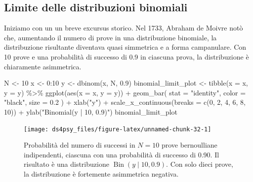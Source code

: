 \documentclass[
  11pt,
]{krantz}
\makeatletter
\newenvironment{Shaded}{\begin{snugshade}}{\end{snugshade}}
\newcommand{\AttributeTok}[1]{\textcolor[rgb]{0.61,0.61,0.61}{#1}}
\newcommand{\DecValTok}[1]{\textcolor[rgb]{0.06,0.06,0.06}{#1}}
\newcommand{\FloatTok}[1]{\textcolor[rgb]{0.06,0.06,0.06}{#1}}
\newcommand{\FunctionTok}[1]{\textcolor[rgb]{0,0,0}{#1}}
\newcommand{\NormalTok}[1]{#1}
\newcommand{\OtherTok}[1]{\textcolor[rgb]{0.37,0.37,0.37}{#1}}
\newcommand{\SpecialCharTok}[1]{\textcolor[rgb]{0,0,0}{#1}}
\newcommand{\StringTok}[1]{\textcolor[rgb]{0.5,0.5,0.5}{#1}}
\newenvironment{kframe}{%
\medskip{}
\setlength{\fboxsep}{.8em}
 \def\at@end@of@kframe{}%
 \ifinner\ifhmode%
  \def\at@end@of@kframe{\end{minipage}}%
  \begin{minipage}{\columnwidth}%
 \fi\fi%
 \def\FrameCommand##1{\hskip\@totalleftmargin \hskip-\fboxsep
 \colorbox{shadecolor}{##1}\hskip-\fboxsep
     \hskip-\linewidth \hskip-\@totalleftmargin \hskip\columnwidth}%
 \MakeFramed {\advance\hsize-\width
   \@totalleftmargin\z@ \linewidth\hsize
   \@setminipage}}%
 {\par\unskip\endMakeFramed%
 \at@end@of@kframe}
\renewenvironment{Shaded}{\begin{kframe}}{\end{kframe}}
\DeclareMathOperator{\Bin}{Bin} %
\theoremstyle{definition}
\theoremstyle{definition}
\theoremstyle{definition}
\theoremstyle{definition}
\theoremstyle{remark}
\makeatother
\begin{document}
\hypertarget{limite-delle-distribuzioni-binomiali}{%
\subsection{Limite delle distribuzioni binomiali}\label{limite-delle-distribuzioni-binomiali}}

Iniziamo con un un breve excursus storico. Nel 1733, Abraham de Moivre notò che, aumentando il numero di prove in una distribuzione binomiale, la distribuzione risultante diventava quasi simmetrica e a forma campanulare. Con 10 prove e una probabilità di successo di 0.9 in ciascuna prova, la distribuzione è chiaramente asimmetrica.

\begin{Shaded}
\begin{Highlighting}[]
\NormalTok{N }\OtherTok{\textless{}{-}} \DecValTok{10}
\NormalTok{x }\OtherTok{\textless{}{-}} \DecValTok{0}\SpecialCharTok{:}\DecValTok{10}
\NormalTok{y }\OtherTok{\textless{}{-}} \FunctionTok{dbinom}\NormalTok{(x, N, }\FloatTok{0.9}\NormalTok{)}
\NormalTok{binomial\_limit\_plot }\OtherTok{\textless{}{-}}
  \FunctionTok{tibble}\NormalTok{(}\AttributeTok{x =}\NormalTok{ x, }\AttributeTok{y =}\NormalTok{ y) }\SpecialCharTok{\%\textgreater{}\%}
  \FunctionTok{ggplot}\NormalTok{(}\FunctionTok{aes}\NormalTok{(}\AttributeTok{x =}\NormalTok{ x, }\AttributeTok{y =}\NormalTok{ y)) }\SpecialCharTok{+}
  \FunctionTok{geom\_bar}\NormalTok{(}
    \AttributeTok{stat =} \StringTok{"identity"}\NormalTok{, }\AttributeTok{color =} \StringTok{"black"}\NormalTok{, }\AttributeTok{size =} \FloatTok{0.2}
\NormalTok{  ) }\SpecialCharTok{+}
  \FunctionTok{xlab}\NormalTok{(}\StringTok{"y"}\NormalTok{) }\SpecialCharTok{+}
  \FunctionTok{scale\_x\_continuous}\NormalTok{(}\AttributeTok{breaks =} \FunctionTok{c}\NormalTok{(}\DecValTok{0}\NormalTok{, }\DecValTok{2}\NormalTok{, }\DecValTok{4}\NormalTok{, }\DecValTok{6}\NormalTok{, }\DecValTok{8}\NormalTok{, }\DecValTok{10}\NormalTok{)) }\SpecialCharTok{+}
  \FunctionTok{ylab}\NormalTok{(}\StringTok{"Binomial(y | 10, 0.9)"}\NormalTok{)}
\NormalTok{binomial\_limit\_plot}
\end{Highlighting}
\end{Shaded}

\begin{figure}[h]

{\centering \texttt{[image: ds4psy\_files/figure-latex/unnamed-chunk-32-1]} 

}

\caption{Probabilità del numero di successi in $N = 10$ prove bernoulliane indipendenti, ciascuna con una probabilità di successo di 0.90. Il risultato è una distribuzione $\Bin(y \mid 10, 0.9)$. Con solo dieci prove, la distribuzione è fortemente asimmetrica negativa.}\label{fig:unnamed-chunk-32}
\end{figure}
\end{document}
